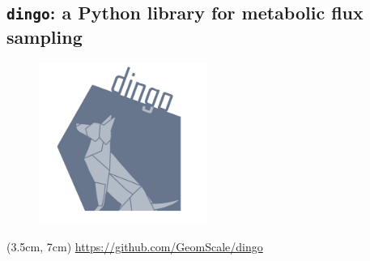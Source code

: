 \documentclass{beamer}
\begin{document}
\begin{frame}
\begin{singlespace}
\begin{columns}[onlytextwidth]
         \end{columns}
      \end{singlespace}

   \end{frame}



   \begin{darkframes}
      \section{
         \texttt{dingo}: a Python library for metabolic flux sampling
      }   
   \end{darkframes}

   \begin{frame}
      
      \begin{figure}
         \includegraphics[width=55mm]{../met_nets/resources/dingo5_transparent.png}
      \end{figure}

      \begin{textblock*}{12cm}(3.5cm, 7cm)
         \href{https://github.com/GeomScale/dingo}{https://github.com/GeomScale/dingo}
      \end{textblock*}

   \end{frame}
\end{document}
